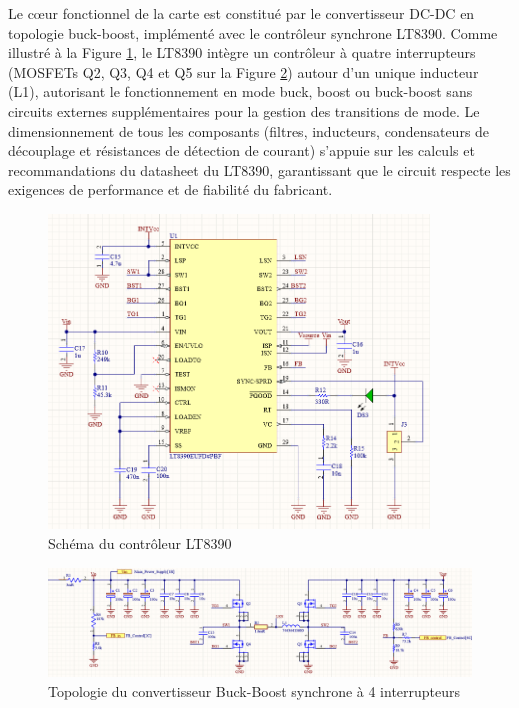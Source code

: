 Le cœur fonctionnel de la carte est constitué par le convertisseur DC-DC en topologie buck-boost, implémenté avec le contrôleur synchrone LT8390. Comme illustré à la Figure \ref{fig:lt8390}, le LT8390 intègre un contrôleur à quatre interrupteurs (MOSFETs Q2, Q3, Q4 et Q5 sur la Figure \ref{fig:buck_boost_converter}) autour d'un unique inducteur (L1), autorisant le fonctionnement en mode buck, boost ou buck-boost sans circuits externes supplémentaires pour la gestion des transitions de mode. Le dimensionnement de tous les composants (filtres, inducteurs, condensateurs de découplage et résistances de détection de courant) s'appuie sur les calculs et recommandations du datasheet du LT8390, garantissant que le circuit respecte les exigences de performance et de fiabilité du fabricant.

\begin{figure}[H]
    \centering
    \includegraphics[width=0.9\textwidth]{figures/LT8390.png}
    \caption{Schéma du contrôleur LT8390}
    \label{fig:lt8390}
\end{figure}

\begin{figure}[H]
    \centering
    \includegraphics[width=1\textwidth]{figures/PowerStage.png}
    \caption{Topologie du convertisseur Buck-Boost synchrone à 4 interrupteurs}
    \label{fig:buck_boost_converter}
\end{figure}

